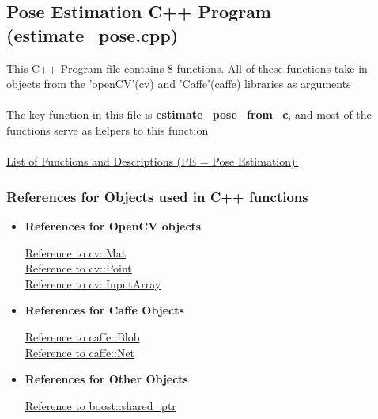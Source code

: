 \documentclass{scrreprt}
\begin{document}
\subsection{Pose Estimation C++ Program (estimate\_pose.cpp)}

This C++ Program file contains 8 functions. All of these functions take in objects from the 'openCV'(cv) and 'Caffe'(caffe) libraries as arguments
\\\\
The key function in this file is \textbf{estimate\_pose\_from\_c}, and most of the functions serve as helpers to this function
\\\\
\underline{List of Functions and Descriptions (PE = Pose Estimation):}
\\
\subsubsection{References for Objects used in C++ functions}

\begin{itemize}
    \item \textbf{References for OpenCV objects}

    \href{http://docs.opencv.org/3.1.0/d3/d63/classcv_1_1Mat.html#details}{Reference to cv::Mat}
    \\
    \href{http://docs.opencv.org/3.1.0/db/d4e/classcv_1_1Point__.html}{Reference to cv::Point}
    \\
    \href{http://docs.opencv.org/3.1.0/d4/d32/classcv_1_1__InputArray.html}{Reference to cv::InputArray}


    \item \textbf{References for Caffe Objects}

    \href{http://caffe.berkeleyvision.org/doxygen/classcaffe_1_1Blob.html}{Reference to caffe::Blob}
    \\
    \href{http://caffe.berkeleyvision.org/doxygen/classcaffe_1_1Net.html}{Reference to caffe::Net}




    \item \textbf{References for Other Objects}

    \href{http://www.boost.org/doc/libs/1_63_0/libs/smart_ptr/shared_ptr.htm}{Reference to boost::shared\_ptr}

\end{itemize}
\end{document}
